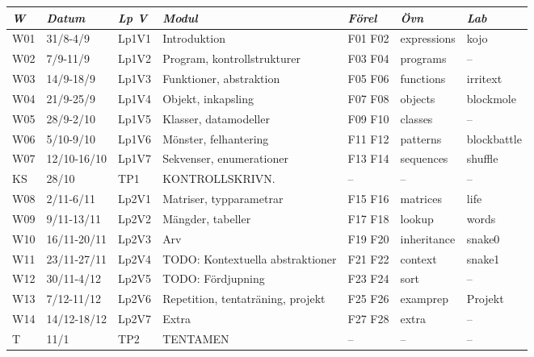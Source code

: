 \begin{tabular}{l|l|l|l|l|l|l}
\textit{W} & \textit{Datum} & \textit{Lp V} & \textit{Modul} & \textit{Förel} & \textit{Övn} & \textit{Lab} \\ \hline \hline
W01 & 31/8-4/9 & Lp1V1 & Introduktion & F01 F02 & expressions & kojo \\
W02 & 7/9-11/9 & Lp1V2 & Program, kontrollstrukturer & F03 F04 & programs & -- \\
W03 & 14/9-18/9 & Lp1V3 & Funktioner, abstraktion & F05 F06 & functions & irritext \\
W04 & 21/9-25/9 & Lp1V4 & Objekt, inkapsling & F07 F08 & objects & blockmole \\
W05 & 28/9-2/10 & Lp1V5 & Klasser, datamodeller & F09 F10 & classes & -- \\
W06 & 5/10-9/10 & Lp1V6 & Mönster, felhantering & F11 F12 & patterns & blockbattle \\
W07 & 12/10-16/10 & Lp1V7 & Sekvenser, enumerationer & F13 F14 & sequences & shuffle \\
KS & 28/10 & TP1 & KONTROLLSKRIVN. & -- & -- & -- \\
W08 & 2/11-6/11 & Lp2V1 & Matriser, typparametrar & F15 F16 & matrices & life \\
W09 & 9/11-13/11 & Lp2V2 & Mängder, tabeller & F17 F18 & lookup & words \\
W10 & 16/11-20/11 & Lp2V3 & Arv & F19 F20 & inheritance & snake0 \\
W11 & 23/11-27/11 & Lp2V4 & TODO: Kontextuella abstraktioner & F21 F22 & context & snake1 \\
W12 & 30/11-4/12 & Lp2V5 & TODO: Fördjupning & F23 F24 & sort & -- \\
W13 & 7/12-11/12 & Lp2V6 & Repetition, tentaträning, projekt & F25 F26 & examprep & Projekt \\
W14 & 14/12-18/12 & Lp2V7 & Extra & F27 F28 & extra & -- \\
T & 11/1 & TP2 & TENTAMEN & -- & -- & -- \\
\end{tabular}
